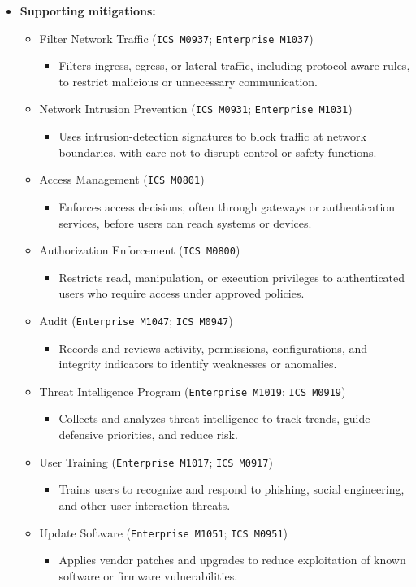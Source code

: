 \documentclass[10pt,a4paper,oneside]{report}
\begin{document}
\begin{itemize}
\item \textbf{Supporting mitigations:}
\begin{itemize}
\item Filter Network Traffic (\texttt{ICS M0937}; \texttt{Enterprise M1037})
\begin{itemize}
\item Filters ingress, egress, or lateral traffic, including protocol-aware rules, to restrict malicious or unnecessary communication.
\end{itemize}
\item Network Intrusion Prevention (\texttt{ICS M0931}; \texttt{Enterprise M1031})
\begin{itemize}
\item Uses intrusion-detection signatures to block traffic at network boundaries, with care not to disrupt control or safety functions.
\end{itemize}
\item Access Management (\texttt{ICS M0801})
\begin{itemize}
\item Enforces access decisions, often through gateways or authentication services, before users can reach systems or devices.
\end{itemize}
\item Authorization Enforcement (\texttt{ICS M0800})
\begin{itemize}
\item Restricts read, manipulation, or execution privileges to authenticated users who require access under approved policies.
\end{itemize}
\item Audit (\texttt{Enterprise M1047}; \texttt{ICS M0947})
\begin{itemize}
\item Records and reviews activity, permissions, configurations, and integrity indicators to identify weaknesses or anomalies.
\end{itemize}
\item Threat Intelligence Program (\texttt{Enterprise M1019}; \texttt{ICS M0919})
\begin{itemize}
\item Collects and analyzes threat intelligence to track trends, guide defensive priorities, and reduce risk.
\end{itemize}
\item User Training (\texttt{Enterprise M1017}; \texttt{ICS M0917})
\begin{itemize}
\item Trains users to recognize and respond to phishing, social engineering, and other user-interaction threats.
\end{itemize}
\item Update Software (\texttt{Enterprise M1051}; \texttt{ICS M0951})
\begin{itemize}
\item Applies vendor patches and upgrades to reduce exploitation of known software or firmware vulnerabilities.
\end{itemize}
\end{itemize}
\end{itemize}
\end{document}
